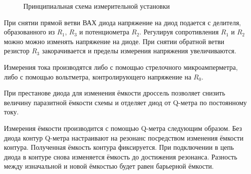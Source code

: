 \documentclass[a4paper]{article}
\begin{document}
\begin{figure}[H]
    \begin{center}
    \caption{Принципиальная схема измерительной установки}
    \label{fig:Scheme}
    \end{center}
\end{figure}


При снятии прямой ветви ВАХ диода напряжение на диод подается с делителя, образованного из $R_1$, $R_3$ и потенциометра $R_2$. Регулируя сопротивления $R_1$ и $R_2$ можно можно изменять напряжение на диоде. При снятии обратной ветви резистор $R_3$ закорачивается и пределы измерения напряжения увеличиваются.

Измерения тока производятся либо с помощью стрелочного микроамперметра, либо с помощью вольтметра, контролирующего напряжение на $R_0$.

При престанове диода для изменения ёмкости дроссель позволяет снизить величину паразитной ёмкости схемы и отделяет диод от Q-метра по постоянному току.

Измерения ёмкости производится с помощью Q-метра следующим образом. Без диода контур Q-метра настраивают на резонанс посредством изменения ёмкости контура. Полученная ёмкость контура фиксируется. При подключении в цепь диода в контуре снова изменяется ёмкость до достижения резонанса. Разность между изначальной и новой ёмкостью будет равен барьерной ёмкости. 
\end{document}
